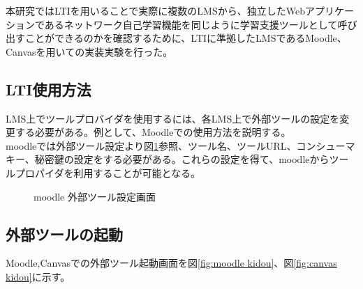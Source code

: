 \label{tag:experiment}
本研究ではLTIを用いることで実際に複数のLMSから、独立したWebアプリケーションであるネットワーク自己学習機能を同じように学習支援ツールとして呼び出すことができるのかを確認するために、LTIに準拠したLMSであるMoodle、Canvasを用いての実装実験を行った。\\

\subsection{LTI使用方法}
LMS上でツールプロバイダを使用するには、各LMS上で外部ツールの設定を変更する必要がある。例として、Moodleでの使用方法を説明する。\\
moodleでは外部ツール設定より図\ref{fig:moodle config}参照、ツール名、ツールURL、コンシューマキー、秘密鍵の設定をする必要がある。これらの設定を得て、moodleからツールプロパイダを利用することが可能となる。\\
\begin{figure}[htbp]
  \begin{center}
    \caption{moodle 外部ツール設定画面}
    \label{fig:moodle config}
  \end{center}
\end{figure}

\subsection{外部ツールの起動}
Moodle,Canvasでの外部ツール起動画面を図\ref{fig:moodle kidou}、図\ref{fig:canvas kidou}に示す。


